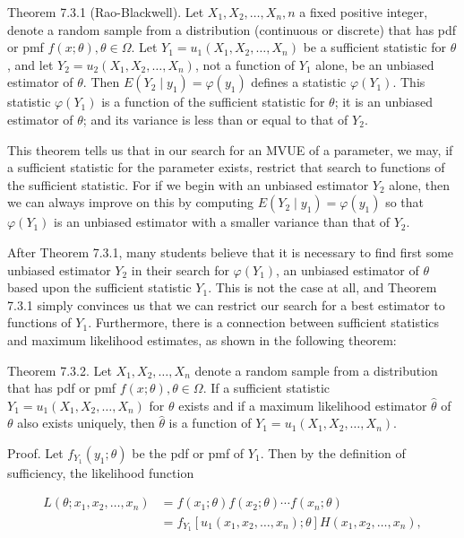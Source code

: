 Theorem 7.3.1 (Rao-Blackwell). Let $X_{1}, X_{2}, \ldots, X_{n}, n$ a fixed positive integer, denote a random sample from a distribution (continuous or discrete) that has pdf or pmf $f(x ; \theta), \theta \in \Omega$. Let $Y_{1}=u_{1}\left(X_{1}, X_{2}, \ldots, X_{n}\right)$ be a sufficient statistic for $\theta$, and let $Y_{2}=u_{2}\left(X_{1}, X_{2}, \ldots, X_{n}\right)$, not a function of $Y_{1}$ alone, be an unbiased estimator of $\theta$. Then $E\left(Y_{2} \mid y_{1}\right)=\varphi\left(y_{1}\right)$ defines a statistic $\varphi\left(Y_{1}\right)$. This statistic $\varphi\left(Y_{1}\right)$ is a function of the sufficient statistic for $\theta$; it is an unbiased estimator of $\theta$; and its variance is less than or equal to that of $Y_{2}$.

This theorem tells us that in our search for an MVUE of a parameter, we may, if a sufficient statistic for the parameter exists, restrict that search to functions of the sufficient statistic. For if we begin with an unbiased estimator $Y_{2}$ alone, then we can always improve on this by computing $E\left(Y_{2} \mid y_{1}\right)=\varphi\left(y_{1}\right)$ so that $\varphi\left(Y_{1}\right)$ is an unbiased estimator with a smaller variance than that of $Y_{2}$.

After Theorem 7.3.1, many students believe that it is necessary to find first some unbiased estimator $Y_{2}$ in their search for $\varphi\left(Y_{1}\right)$, an unbiased estimator of $\theta$ based upon the sufficient statistic $Y_{1}$. This is not the case at all, and Theorem 7.3.1 simply convinces us that we can restrict our search for a best estimator to functions of $Y_{1}$. Furthermore, there is a connection between sufficient statistics and maximum likelihood estimates, as shown in the following theorem:

Theorem 7.3.2. Let $X_{1}, X_{2}, \ldots, X_{n}$ denote a random sample from a distribution that has pdf or pmf $f(x ; \theta), \theta \in \Omega$. If a sufficient statistic $Y_{1}=u_{1}\left(X_{1}, X_{2}, \ldots, X_{n}\right)$ for $\theta$ exists and if a maximum likelihood estimator $\hat{\theta}$ of $\theta$ also exists uniquely, then $\hat{\theta}$ is a function of $Y_{1}=u_{1}\left(X_{1}, X_{2}, \ldots, X_{n}\right)$.

Proof. Let $f_{Y_{1}}\left(y_{1} ; \theta\right)$ be the pdf or pmf of $Y_{1}$. Then by the definition of sufficiency, the likelihood function

$$
\begin{aligned}
L\left(\theta ; x_{1}, x_{2}, \ldots, x_{n}\right) & =f\left(x_{1} ; \theta\right) f\left(x_{2} ; \theta\right) \cdots f\left(x_{n} ; \theta\right) \\
& =f_{Y_{1}}\left[u_{1}\left(x_{1}, x_{2}, \ldots, x_{n}\right) ; \theta\right] H\left(x_{1}, x_{2}, \ldots, x_{n}\right),
\end{aligned}
$$

